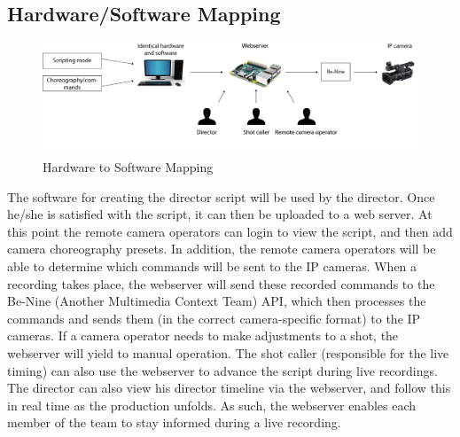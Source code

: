 \documentclass[11pt,twoside,a4paper]{article}
\begin{document}
\subsection{Hardware/Software Mapping}
\begin{figure}[H]
	\centering
	\includegraphics[width=\textwidth]{HWsoftwaremapping}
	\caption{Hardware to Software Mapping}
	\label{fig:mapping}
\end{figure}

The software for creating the director script will be used by the director. Once he/she is satisfied with the script, it can then be uploaded to a web server. At this point the remote camera operators can login to view the script, and then add camera choreography presets. In addition, the remote camera operators will be able to determine which commands will be sent to the IP cameras. When a recording takes place, the webserver will send these recorded commands to the Be-Nine (Another Multimedia Context Team) API, which then processes the commands and sends them (in the correct camera-specific format) to the IP cameras. If a camera operator needs to make adjustments to a shot, the webserver will yield to manual operation. The shot caller (responsible for the live timing) can also use the webserver to advance the script during live recordings. The director can also view his director timeline via the webserver, and follow this in real time as the production unfolds. As such, the webserver enables each member of the team to stay informed during a live recording.
\end{document}
